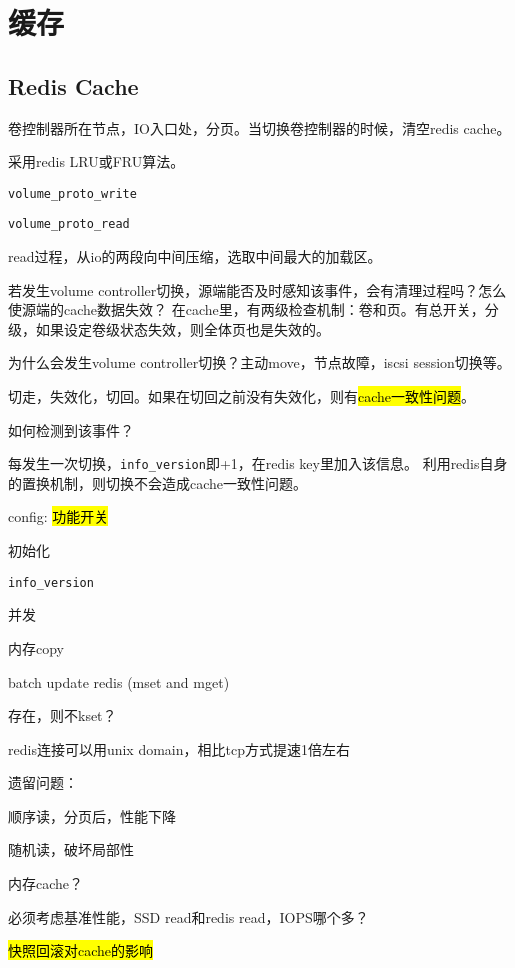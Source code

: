 \chapter{缓存}

\section{Redis Cache}

卷控制器所在节点，IO入口处，分页。当切换卷控制器的时候，清空redis cache。

采用redis LRU或FRU算法。

\begin{compactitem}
    \item \verb|volume_proto_write|
    \item \verb|volume_proto_read|
\end{compactitem}

read过程，从io的两段向中间压缩，选取中间最大的加载区。

若发生volume controller切换，源端能否及时感知该事件，会有清理过程吗？怎么使源端的cache数据失效？
在cache里，有两级检查机制：卷和页。有总开关，分级，如果设定卷级状态失效，则全体页也是失效的。

为什么会发生volume controller切换？主动move，节点故障，iscsi session切换等。

切走，失效化，切回。如果在切回之前没有失效化，则有\hl{cache一致性问题}。

如何检测到该事件？

\begin{tcolorbox}
每发生一次切换，\verb|info_version|即+1，在redis key里加入该信息。
利用redis自身的置换机制，则切换不会造成cache一致性问题。
\end{tcolorbox}

\begin{compactenum}
\item config: \hl{功能开关}
\item 初始化
\item \verb|info_version|
\item 并发
\item 内存copy
\item batch update redis (mset and mget)
\item 存在，则不kset？
\item redis连接可以用unix domain，相比tcp方式提速1倍左右
\end{compactenum}

遗留问题：
\begin{enumbox}
\item 顺序读，分页后，性能下降
\item 随机读，破坏局部性
\item 内存cache？
\item 必须考虑基准性能，SSD read和redis read，IOPS哪个多？
\item \hl{快照回滚对cache的影响}
\end{enumbox}

